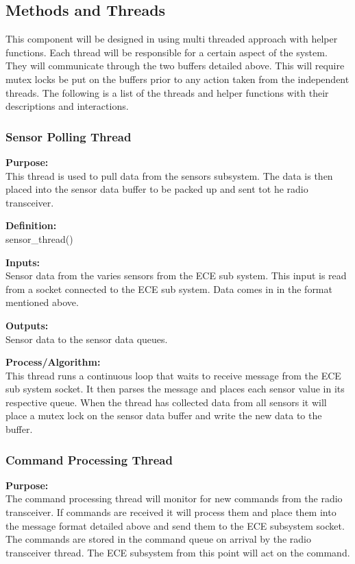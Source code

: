 \documentclass[10pt,draftclsnofoot,onecolumn,compsoc]{IEEEtran}
\begin{document}
\subsection{Methods and Threads}
This component will be designed in using multi threaded approach with helper functions. Each thread will be responsible for a certain aspect of the system. They will communicate through the two buffers detailed above. This will require mutex locks be put on the buffers prior to any action taken from the independent threads. The following is a list of the threads and helper functions with their descriptions and interactions. \par
\subsubsection{Sensor Polling Thread} 
{\bf Purpose:} \\
This thread is used to pull data from the sensors subsystem. The data is then placed into the sensor data buffer to be packed up and sent tot he radio transceiver. \par
{\bf Definition:} \\ 
sensor\_thread() \par
{\bf Inputs:} \\  Sensor data from the varies sensors from the ECE sub system. This input is read from a socket connected to the ECE sub system. Data comes in in the format mentioned above. \par
{\bf Outputs:} \\ Sensor data to the sensor data queues. \par
{\bf Process/Algorithm:} \\
This thread runs a continuous loop that waits to receive message from the ECE sub system socket. It then parses the message and places each sensor value in its respective queue. When the thread has collected data from all sensors it will place a mutex lock on the sensor data buffer and write the new data to the buffer. \par
\subsubsection{Command Processing Thread}
{\bf Purpose:} \\
The command processing thread will monitor for new commands from the radio transceiver. If commands are received it will process them and place them into the message format detailed above and send them to the ECE subsystem socket. The commands are stored in the command queue on arrival by the radio transceiver thread. The ECE subsystem from this point will act on the command. \par
\end{document}
